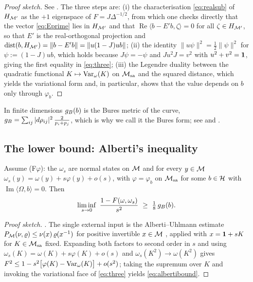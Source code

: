 \begin{proof}[Proof sketch]
See \cite[Lemma ``Explicit real-orthogonal projection onto $H_{\cM'}$'' and Theorem ``Three faces of the
Bures form'']{RigorSV}.  The three steps are: (i) the characterisation \eqref{eq:realsub} of $H_{\cM'}$ as
the $+1$ eigenspace of $F=J\Delta^{-1/2}$, from which one checks directly that the vector \eqref{eq:Eprime}
lies in $H_{\cM'}$ and that $\operatorname{Re}\langle b-E'b,\zeta\rangle=0$ for all $\zeta\in H_{\mathcal M'}$,
so that $E'$ is the real-orthogonal projection and $\operatorname{dist}(b,H_{\mathcal M'})=\|b-E'b\|=\|u(1-J)ub\|$;
(ii) the identity $\|u\psi\|^{2}=\tfrac12\|\psi\|^{2}$ for $\psi:=(1-J)ub$, which holds because
$J\psi=-\psi$ and $Ju^{2}J=v^{2}$ with $u^{2}+v^{2}=\mathbf 1$, giving the first equality in \eqref{eq:three};
(iii) the Legendre duality between the quadratic functional $K\mapsto\operatorname{Var}_{\omega}(K)$ on $\mathcal M_{\rm sa}$ and
the squared distance, which yields the variational form and, in particular, shows that the value depends on
$b$ only through $\varphi_{b}$.
\end{proof}

In finite dimensions $g_{B}(b)$ is the Bures metric of the curve, $g_{B}=\sum_{ij}|d\rho_{ij}|^{2}\,
\frac{2}{p_{i}+p_{j}}$, which is why we call it the Bures form; see \cite[Prop.~5.2, `Identification of the two metrics in finite dimensions']{RigorSV} and
\cite{AU02}.

\subsection{The lower bound: Alberti's inequality}

\begin{theorem}[Alberti]\label{thm:alberti}
Assume \textup{(F$\varphi$)}: the $\omega_{s}$ are normal states on $\mathcal M$ and for every $y\in\mathcal M$
$\omega_{s}(y)=\omega(y)+s\varphi(y)+o(s)$, with $\varphi=\varphi_{b}$ on $\mathcal M_{\rm sa}$ for some $b\in\mathcal H$
with $\operatorname{Im}\langle\Omega,b\rangle=0$.  Then
\begin{equation}\label{eq:albertibound}
 \liminf_{s\to0}\ \frac{1-\Fid(\omega,\omega_{s})}{s^{2}}\ \ge\ \tfrac18\,\gB(b).
\end{equation}
\end{theorem}

\begin{proof}[Proof sketch]
\cite[Theorem ``Upper bound'']{RigorSV}.  The single external input is the Alberti--Uhlmann estimate
$P_{\mathcal M}(\nu,\varrho)\le\nu(x)\,\varrho(x^{-1})$ for positive invertible $x\in\mathcal M$
\cite[p.~4, (1--4)]{AU02}, applied with $x=\mathbf 1+sK$ for $K\in\mathcal M_{\rm sa}$ fixed.  Expanding both factors to
second order in $s$ and using $\omega_{s}(K)=\omega(K)+s\varphi(K)+o(s)$ and
$\omega_{s}(K^{2})\to\omega(K^{2})$ gives
$F^{2}\le1-s^{2}\bigl[\varphi(K)-\operatorname{Var}_{\omega}(K)\bigr]+o(s^{2})$; taking the supremum over $K$ and
invoking the variational face of \eqref{eq:three} yields \eqref{eq:albertibound}.
\end{proof}

